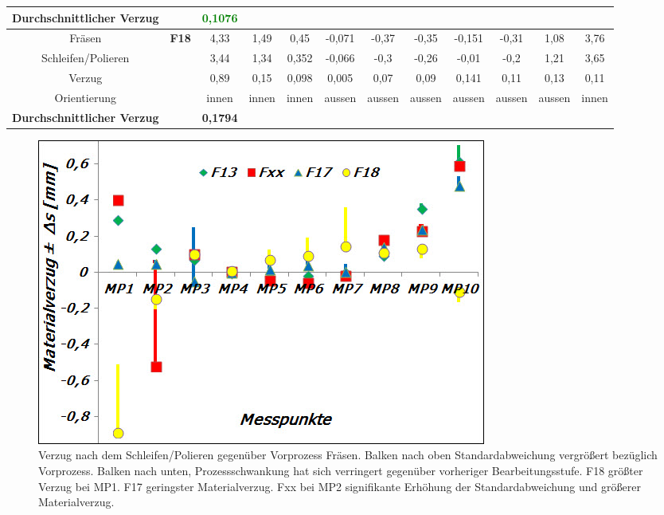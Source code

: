 \documentclass[12pt,a4paper,parskip,twoside,BCOR5mm,headsepline]{scrartcl}
\begin{document}
\begin{description*}
\begin{table}
\begin{tabular}{cccccccccccc}
\textbf{Durchschnittlicher Verzug} && \textbf{\textcolor{green}{0,1076}} &&&&&&&&&\\
\midrule
 Fräsen& \textbf{F18} &4,33  & 1,49 &0,45  & -0,071 &-0,37  &-0,35  &-0,151  & -0,31 &1,08 &3,76  \\
Schleifen/Polieren &&3,44 &1,34 &0,352  &-0,066  & -0,3 &-0,26  &-0,01  &-0,2 &1,21 &3,65  \\
Verzug && 0,89 &0,15  &0,098  & 0,005 &0,07 &0,09  &0,141 &0,11  &0,13 & 0,11 \\
Orientierung &&innen  &innen  &innen &aussen  &aussen  &aussen  & aussen &aussen  & aussen &innen \\
\textbf{Durchschnittlicher Verzug} && \textbf{0,1794} &&&&&&&&&\\
\bottomrule

















\end{tabular}
\end{table}












\newpage
\begin{figure}[hbtp]
\centering
\includegraphics[width=.8\textwidth]{verzugpolier}
\caption{Verzug nach dem Schleifen/Polieren gegenüber Vorprozess Fräsen. Balken nach oben Standardabweichung vergrößert bezüglich Vorprozess. Balken nach unten, Prozessschwankung hat sich verringert gegenüber vorheriger Bearbeitungsstufe. F18 größter Verzug bei MP1. F17 geringster Materialverzug. Fxx bei MP2 signifikante Erhöhung der Standardabweichung und größerer Materialverzug.}
\label{fig:verzugpolier}
\end{figure}




















\end{description*}
\end{document}
